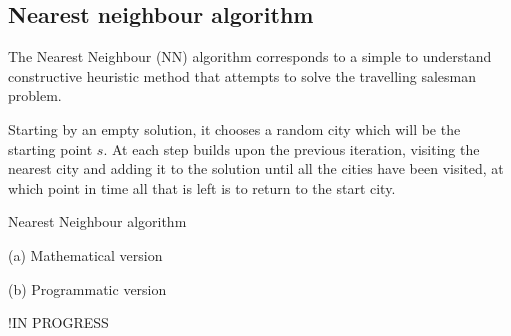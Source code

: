 \subsection{Nearest neighbour algorithm} \label{algorithm-tsp-nn}
The Nearest Neighbour (NN) algorithm corresponds to a simple to understand constructive heuristic method that attempts to solve the travelling salesman problem.\par
Starting by an empty solution, it chooses a random city which will be the starting point $s$. At each step builds upon the previous iteration, visiting the nearest city and adding it to the solution until all the cities have been visited, at which point in time all that is left is to return to the start city.\par


\vspace{-1em}
\begin{center}
    \begin{algorithm}[ht]
        \caption{Nearest Neighbour algorithm}
        \label{alg:nearest neighbour}
        \begin{minipage}[t]{0.49\linewidth}
            (a) Mathematical version
            
        \end{minipage}
        \begin{minipage}[t]{0.49\linewidth}
            (b) Programmatic version
            
        \end{minipage}
    \end{algorithm}
\end{center}



\par
!IN PROGRESS
